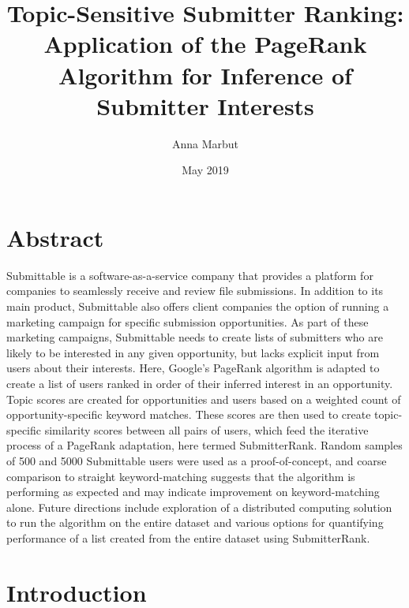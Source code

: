 \documentclass[]{report}   %
\begin{document}
\title{%
Topic-Sensitive Submitter Ranking:\\[0.3em]
\large Application of the PageRank Algorithm for Inference of Submitter Interests}   %
\author{Anna Marbut}         %
\date{May 2019}    %
\maketitle


\chapter*{Abstract}
\label{abstract}

Submittable is a software-as-a-service company that provides a platform for companies to seamlessly receive and review file submissions. In addition to its main product, Submittable also offers client companies the option of running a marketing campaign for specific submission opportunities. As part of these marketing campaigns, Submittable needs to create lists of submitters who are likely to be interested in any given opportunity, but lacks explicit input from users about their interests. Here, Google's PageRank algorithm is adapted to create a list of users ranked in order of their inferred interest in an opportunity. Topic scores are created for opportunities and users based on a weighted count of opportunity-specific keyword matches. These scores are then used to create topic-specific similarity scores between all pairs of users, which feed the iterative process of a PageRank adaptation, here termed SubmitterRank. Random samples of 500 and 5000 Submittable users were used as a proof-of-concept, and coarse comparison to straight keyword-matching suggests that the algorithm is performing as expected and may indicate improvement on keyword-matching alone. Future directions include exploration of a distributed computing solution to run the algorithm on the entire dataset and various options for quantifying performance of a list created from the entire dataset using SubmitterRank.


\tableofcontents

\chapter{Introduction}
\end{document}
